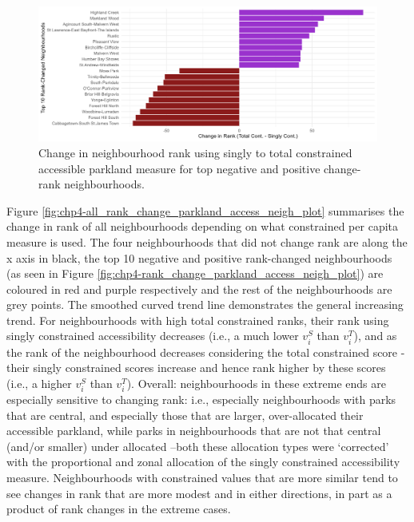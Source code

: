 \documentclass[
11pt, %
oneside, %
english, %
singlespacing, %
]{macthesis} %
\begin{document}
\begin{figure}

{\centering \includegraphics[width=6in]{./data/figures/chp4-rank_change_parkland_access_neigh_plot} 

}

\caption{\label{fig:chp4-rank_change_parkland_access_neigh_plot}Change in neighbourhood rank using singly to total constrained accessible parkland measure for top negative and positive change-rank neighbourhoods.}\label{fig:unnamed-chunk-66}
\end{figure}

Figure \ref{fig:chp4-all_rank_change_parkland_access_neigh_plot} summarises the change in rank of all neighbourhoods depending on what constrained per capita measure is used. The four neighbourhoods that did not change rank are along the x axis in black, the top 10 negative and positive rank-changed neighbourhoods (as seen in Figure \ref{fig:chp4-rank_change_parkland_access_neigh_plot}) are coloured in red and purple respectively and the rest of the neighbourhoods are grey points. The smoothed curved trend line demonstrates the general increasing trend. For neighbourhoods with high total constrained ranks, their rank using singly constrained accessibility decreases (i.e., a much lower \(v^S_i\) than \(v^T_i\)), and as the rank of the neighbourhood decreases considering the total constrained score - their singly constrained scores increase and hence rank higher by these scores (i.e., a higher \(v^S_i\) than \(v^T_i\)). Overall: neighbourhoods in these extreme ends are especially sensitive to changing rank: i.e., especially neighbourhoods with parks that are central, and especially those that are larger, over-allocated their accessible parkland, while parks in neighbourhoods that are not that central (and/or smaller) under allocated --both these allocation types were `corrected' with the proportional and zonal allocation of the singly constrained accessibility measure. Neighbourhoods with constrained values that are more similar tend to see changes in rank that are more modest and in either directions, in part as a product of rank changes in the extreme cases.
\end{document}
